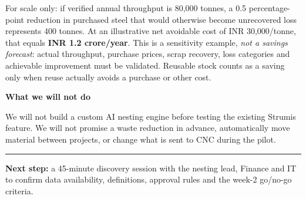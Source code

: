 \documentclass[10pt,a4paper]{article}
\newcommand{\sectionlabel}[1]{\vspace{2pt}\textbf{#1}\par}
\begin{document}
For scale only: if verified annual throughput is 80,000 tonnes, a 0.5 percentage-point reduction in purchased steel that would otherwise become unrecovered loss represents 400 tonnes. At an illustrative net avoidable cost of INR 30,000/tonne, that equals \textbf{INR 1.2 crore/year}. This is a sensitivity example, \emph{not a savings forecast}: actual throughput, purchase prices, scrap recovery, loss categories and achievable improvement must be validated. Reusable stock counts as a saving only when reuse actually avoids a purchase or other cost.

\sectionlabel{What we will not do}
We will not build a custom AI nesting engine before testing the existing Strumis feature. We will not promise a waste reduction in advance, automatically move material between projects, or change what is sent to CNC during the pilot.

\vspace{2pt}
\hrule
\textbf{Next step:} a 45-minute discovery session with the nesting lead, Finance and IT to confirm data availability, definitions, approval rules and the week-2 go/no-go criteria.
\end{document}
